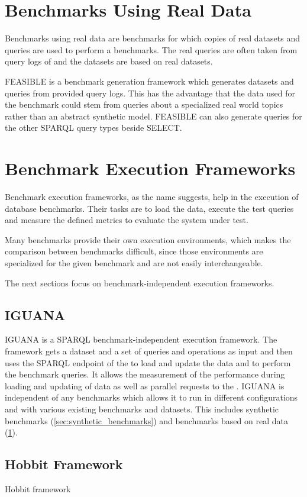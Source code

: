 \section{Benchmarks Using Real Data}
\label{sec:benchmarks_real_data}
Benchmarks using real data are benchmarks for which copies of real datasets and queries are used to perform a benchmarks.
The real queries are often taken from query logs of \tsp{} and the datasets are based on real datasets\cite{morseyDBpediaSPARQLBenchmark2011}\cite{saleemFEASIBLEFeatureBasedSPARQL2015}.

FEASIBLE is a benchmark generation framework which generates datasets and queries from provided query logs\cite{saleemFEASIBLEFeatureBasedSPARQL2015}.
This has the advantage that the data used for the benchmark could stem from queries about a specialized real world topics rather than an abstract synthetic model.
FEASIBLE can also generate queries for the other SPARQL query types beside SELECT.

\section{Benchmark Execution Frameworks}
\label{sec:benchmark_frameworks}
Benchmark execution frameworks, as the name suggests, help in the execution of database benchmarks.
Their tasks are to load the data, execute the test queries and measure the defined metrics to evaluate the system under test.

Many benchmarks provide their own execution environments, which makes the comparison between benchmarks difficult, since those environments are specialized for the given benchmark and are not easily interchangeable\cite{conradsIguanaGenericFramework2017}.

The next sections focus on benchmark-independent execution frameworks.


\subsection{IGUANA}
\label{sec:iguana}
IGUANA is a SPARQL benchmark-independent execution framework\cite{conradsIguanaGenericFramework2017}.
The framework gets a dataset and a set of queries and operations as input and then uses the SPARQL endpoint of the \ts{} to load and update the data and to perform the benchmark queries.
It allows the measurement of the performance during loading and updating of data as well as parallel requests to the \ts{}.
IGUANA is independent of any benchmarks which allows it to run in different configurations and with various existing benchmarks and datasets.
This includes synthetic benchmarks (\ref{sec:synthetic_benchmarks}) and benchmarks based on real data (\ref{sec:benchmarks_real_data}).





\subsection{Hobbit Framework}
Hobbit framework 
